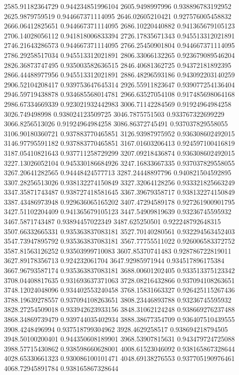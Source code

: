 {2585.91182364729 0.944234851996104
2605.9498997996 0.938896783192952
2625.9879759519 0.944667371114095
2646.02605210421 0.927576005458832
2666.06412825651 0.944667371114095
2686.10220440882 0.941365679105123
2706.14028056112 0.941818006833394
2726.17835671343 0.945513312021891
2746.21643286573 0.944667371114095
2766.25450901804 0.944667371114095
2786.29258517034 0.945513312021891
2806.33066132265 0.923679089546204
2826.36873747495 0.935003582636515
2846.40681362725 0.94372181892395
2866.44488977956 0.945513312021891
2886.48296593186 0.943092203140259
2906.52104208417 0.939753647645314
2926.55911823647 0.939077254136404
2946.59719438878 0.934685568014781
2966.63527054108 0.917485698064168
2986.67334669339 0.923021932442983
3006.71142284569 0.91924964984258
3026.749498998 0.938024123509725
3046.7875751503 0.933767322699229
3066.8256513026 0.91924964984258
3086.86372745491 0.937037829558055
3106.90180360721 0.937883770465851
3126.93987975952 0.936308602492015
3146.97795591182 0.937883770465851
3167.01603206413 0.924597100416819
3187.05410821643 0.937711258729299
3207.09218436874 0.936308602492015
3227.13026052104 0.945330186684926
3247.16833667335 0.937037829558055
3267.20641282565 0.94448424577713
3287.24448897796 0.940821504592895
3307.28256513026 0.938132274150849
3327.32064128256 0.933321825663249
3347.35871743487 0.938727418581645
3367.39679358717 0.938132274150849
3387.43486973948 0.929636065165202
3407.47294589178 0.927261900901795
3427.51102204409 0.941365679105123
3447.54909819639 0.93236745595932
3467.5871743487 0.93894457022349
3487.625250501 0.922248792648315
3507.66332665331 0.935363837083181
3527.70140280561 0.932294563452403
3547.73947895792 0.935363837083181
3567.77755511022 0.926006583372752
3587.81563126252 0.93503999710083
3607.85370741483 0.928786722819011
3627.89178356713 0.924232061704
3647.92985971944 0.934517896175384
3667.96793587174 0.935363837083181
3688.00601202405 0.933513375123342
3708.04408817635 0.931693637371063
3728.08216432866 0.937094108263651
3748.12024048096 0.934402553240458
3768.15831663327 0.926425115267436
3788.19639278557 0.937094108263651
3808.23446893788 0.93236745595932
3828.27254509018 0.933942623933156
3848.31062124248 0.938669276237488
3868.34869739479 0.939744035402934
3888.38677354709 0.936407510439555
3908.4248496994 0.937518799304962
3928.4629258517 0.938694218794505
3948.50100200401 0.944350608189901
3968.53907815631 0.943479724725088
3988.57715430862 0.938598660628001
4008.61523046092 0.938165867328644
4028.65330661323 0.930086100101471
4048.69138276553 0.937705190976461
4068.72945891784 0.938165867328644
}
